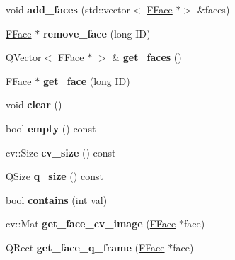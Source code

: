 \begin{DoxyCompactItemize}
\mbox{\label{classFImage_a6075a7daf1825d3b36d48a1cab394528}} 
void {\bfseries add\+\_\+faces} (std\+::vector$<$ \hyperlink{classFFace}{F\+Face} $\ast$$>$ \&faces)
\item 
\mbox{\label{classFImage_a929e98398242b5c90b89189d4dc8e6e3}} 
\hyperlink{classFFace}{F\+Face} $\ast$ {\bfseries remove\+\_\+face} (long ID)
\item 
\mbox{\label{classFImage_a106c5f6eb73bb7f9688f986c8648f8d1}} 
Q\+Vector$<$ \hyperlink{classFFace}{F\+Face} $\ast$ $>$ \& {\bfseries get\+\_\+faces} ()
\item 
\mbox{\label{classFImage_a4b5522340534c0cdb89c1f33734626ab}} 
\hyperlink{classFFace}{F\+Face} $\ast$ {\bfseries get\+\_\+face} (long ID)
\item 
\mbox{\label{classFImage_a6a103bfcb9e83c062dd5ae8ede68cab9}} 
void {\bfseries clear} ()
\item 
\mbox{\label{classFImage_a82d60358d733dce9caef827a17928bc5}} 
bool {\bfseries empty} () const
\item 
\mbox{\label{classFImage_adf4496205cd140b3410cdabcfe40d5ae}} 
cv\+::\+Size {\bfseries cv\+\_\+size} () const
\item 
\mbox{\label{classFImage_a799b0c83add0d9dee24b192c587596ed}} 
Q\+Size {\bfseries q\+\_\+size} () const
\item 
\mbox{\label{classFImage_a721d1e114f45d53d50296bfe2e22f41f}} 
bool {\bfseries contains} (int val)
\item 
\mbox{\label{classFImage_a4c6d99e648fbd7a107337b6bd2991012}} 
cv\+::\+Mat {\bfseries get\+\_\+face\+\_\+cv\+\_\+image} (\hyperlink{classFFace}{F\+Face} $\ast$face)
\item 
\mbox{\label{classFImage_a0edb8f7b81d65d7d28e22f1417a601df}} 
Q\+Rect {\bfseries get\+\_\+face\+\_\+q\+\_\+frame} (\hyperlink{classFFace}{F\+Face} $\ast$face)
\item 
\mbox{\label{classFImage_aa00488f14f8f8c8ea49f27a7f26a0a6b}} 
$$
\end{DoxyCompactItemize}

